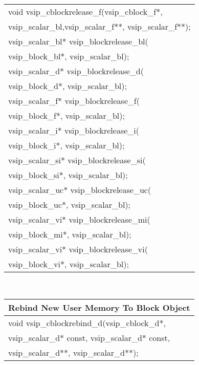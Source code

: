 {\begin{tabular}[H]{l}
void vsip\_cblockrelease\_f(vsip\_cblock\_f*,\\*\hspace{.7cm}vsip\_scalar\_bl,vsip\_scalar\_f**, vsip\_scalar\_f**);\\
vsip\_scalar\_bl* vsip\_blockrelease\_bl(\\*\hspace{.7cm}vsip\_block\_bl*, vsip\_scalar\_bl);\\
vsip\_scalar\_d* vsip\_blockrelease\_d(\\*\hspace{.7cm}vsip\_block\_d*, vsip\_scalar\_bl);\\
vsip\_scalar\_f* vsip\_blockrelease\_f(\\*\hspace{.7cm}vsip\_block\_f*, vsip\_scalar\_bl);\\
vsip\_scalar\_i* vsip\_blockrelease\_i(\\*\hspace{.7cm}vsip\_block\_i*, vsip\_scalar\_bl);\\
vsip\_scalar\_si* vsip\_blockrelease\_si(\\*\hspace{.7cm}vsip\_block\_si*, vsip\_scalar\_bl);\\
vsip\_scalar\_uc* vsip\_blockrelease\_uc(\\*\hspace{.7cm}vsip\_block\_uc*, vsip\_scalar\_bl);\\
vsip\_scalar\_vi* vsip\_blockrelease\_mi(\\*\hspace{.7cm}vsip\_block\_mi*, vsip\_scalar\_bl);\\
vsip\_scalar\_vi* vsip\_blockrelease\_vi(\\*\hspace{.7cm}vsip\_block\_vi*, vsip\_scalar\_bl);\\
\end{tabular}\\
\begin{tabular}[H]{l}
\multicolumn{1}{c}{\rmfamily \bfseries Rebind New User Memory To Block Object\vspace{.1cm}}\\ \hline
void vsip\_cblockrebind\_d(vsip\_cblock\_d*,\\*\hspace{.7cm}vsip\_scalar\_d* const, vsip\_scalar\_d* const,\\*\hspace{.7cm}vsip\_scalar\_d**, vsip\_scalar\_d**);\\

\end{tabular}}
